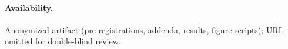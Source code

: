 \documentclass[letterpaper,twocolumn,10pt]{article}
\theoremstyle{definition}
\begin{document}
\FloatBarrier
\paragraph{Availability.}
Anonymized artifact (pre\nobreakdash-registrations, addenda, results, figure scripts); URL omitted for double\nobreakdash-blind review.\label{paper:body-end}

\clearpage


\end{document}
